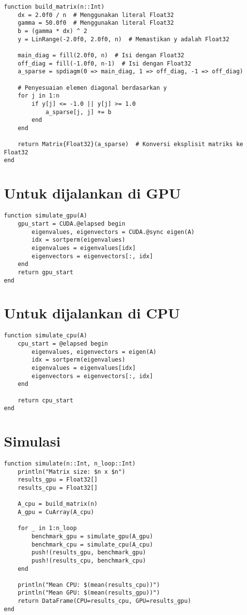 \begin{lstlisting}
function build_matrix(n::Int)
    dx = 2.0f0 / n  # Menggunakan literal Float32
    gamma = 50.0f0  # Menggunakan literal Float32
    b = (gamma * dx) ^ 2
    y = LinRange(-2.0f0, 2.0f0, n)  # Memastikan y adalah Float32

    main_diag = fill(2.0f0, n)  # Isi dengan Float32
    off_diag = fill(-1.0f0, n-1)  # Isi dengan Float32
    a_sparse = spdiagm(0 => main_diag, 1 => off_diag, -1 => off_diag)

    # Penyesuaian elemen diagonal berdasarkan y
    for j in 1:n
        if y[j] <= -1.0 || y[j] >= 1.0
            a_sparse[j, j] += b
        end
    end

    return Matrix{Float32}(a_sparse)  # Konversi eksplisit matriks ke Float32
end
\end{lstlisting}

\section{Untuk dijalankan di GPU}

\begin{lstlisting}
function simulate_gpu(A)
    gpu_start = CUDA.@elapsed begin
        eigenvalues, eigenvectors = CUDA.@sync eigen(A)
        idx = sortperm(eigenvalues)
        eigenvalues = eigenvalues[idx]
        eigenvectors = eigenvectors[:, idx]
    end
    return gpu_start
end
\end{lstlisting}

\section{Untuk dijalankan di CPU}

\begin{lstlisting}
function simulate_cpu(A)
    cpu_start = @elapsed begin
        eigenvalues, eigenvectors = eigen(A)
        idx = sortperm(eigenvalues)
        eigenvalues = eigenvalues[idx]
        eigenvectors = eigenvectors[:, idx]
    end

    return cpu_start
end
\end{lstlisting}

\section{Simulasi}

\begin{lstlisting}
function simulate(n::Int, n_loop::Int)
    println("Matrix size: $n x $n")
    results_gpu = Float32[]
    results_cpu = Float32[]

    A_cpu = build_matrix(n)
    A_gpu = CuArray(A_cpu)

    for _ in 1:n_loop
        benchmark_gpu = simulate_gpu(A_gpu)
        benchmark_cpu = simulate_cpu(A_cpu)
        push!(results_gpu, benchmark_gpu)
        push!(results_cpu, benchmark_cpu)
    end

    println("Mean CPU: $(mean(results_cpu))")
    println("Mean GPU: $(mean(results_gpu))")
    return DataFrame(CPU=results_cpu, GPU=results_gpu)
end
\end{lstlisting}

